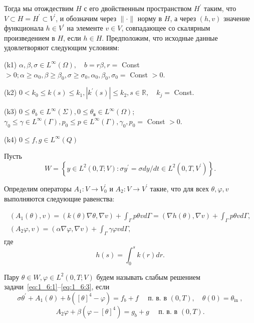 Тогда мы отождествим $H$ с его двойственным пространством $H^{\prime}$
таким, что $V \subset H=H^{\prime} \subset V^{\prime}$,
и обозначим через $\|\cdot\|$ норму в $H$, а через $(h, v)$ значение
функционала $h \in V^{\prime}$ на элементе $v \in V$, совпадающее
со скалярным произведением в $H$, если $h \in H$.
Предположим, что исходные данные удовлетворяют следующим условиям:

(k1) $\alpha, \beta, \sigma \in L^{\infty}(\Omega),
\quad b=r \beta, r=$ Const $>0 ; \alpha \geq \alpha_{0}, \beta \geq \beta_{0},
\sigma \geq \sigma_{0}, \alpha_{0}, \beta_{0}, \sigma_{0}=$ Const $>0$.

(k2) $0<k_{0} \leq k(s) \leq k_{1},\left|k^{\prime}(s)\right| \leq k_{2},
s \in \mathbb{R}, \quad k_{j}=$ Const.

(k3) $0 \leq \theta_{b} \in L^{\infty}(\Sigma), 0 \leq \theta_{\text{в}}
\in L^{\infty}(\Omega)$; $\gamma_{0} \leq \gamma \in L^{\infty}(\Gamma), p_{0}
\leq p \in L^{\infty}(\Gamma), \gamma_{0}, p_{0}=$ Const $>0$.

(k4) $0 \leq f, g \in L^{\infty}(Q)$

Пусть
\[
    W=\left\{y \in L^{2}(0, T ; V): \sigma y^{\prime}=\sigma d y / d t \in L^{2}
    \left(0, T, V^{\prime}\right)\right\}.
\]


Определим операторы $A_{1}: V \rightarrow V_{0}^{\prime}$ и $A_{2}: V \rightarrow V^{\prime}$
такие, что для всех $\theta, \varphi, v$ выполняются следующие равенства:

\[
    \begin{gathered}
        \left(A_{1}(\theta), v\right)=(k(\theta) \nabla \theta, \nabla v)
        +\int_{\Gamma} p \theta v d \Gamma=(\nabla h(\theta), \nabla v)
        +\int_{\Gamma} p \theta v d \Gamma, \\
        \left(A_{2} \varphi, v\right)=(\alpha \nabla \varphi, \nabla v)
        +\int_{\Gamma} \gamma \varphi v d \Gamma,
    \end{gathered}
\]
где
\[
    h(s)=\int_{0}^{s} k(r) d r.
\]

\begin{definition}
    Пару $\theta \in W, \varphi \in L^{2}(0, T ; V)$ будем называть слабым
    решением задачи~\eqref{eq:1_6:1}--\eqref{eq:1_6:3}, если
    \begin{equation}
        \label{eq:1_6:4}
        \sigma \theta^{\prime}+A_{1}(\theta)+b\left([\theta]^{4}-\varphi\right)=f_{b}+f
        \quad \text { п. в. в }(0, T), \quad \theta(0)=\theta_{\text {in }},
    \end{equation}
    \begin{equation}
        \label{eq:1_6:5}
        A_{2} \varphi+\beta\left(\varphi-[\theta]^{4}\right)
        =g_{b}+g \quad \text { п. в. в }(0, T).
    \end{equation}
\end{definition}

